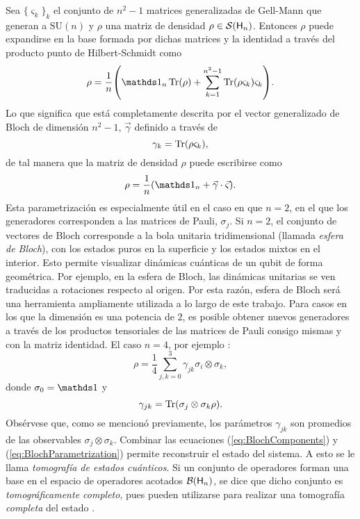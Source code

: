Sea $\{\varsigma_{k}\}_{k}$ el conjunto de $n^{2}-1$ matrices generalizadas de Gell-Mann que generan a $\text{SU}(n)$ y $\rho$ una matriz de densidad $\rho\in\mathcal{S}({\sf H}_{n})$. Entonces $\rho$ puede expandirse en la base formada por dichas matrices y la identidad a través del producto punto de Hilbert-Schmidt como
\begin{equation}
    \rho=\frac{1}{n}\qty(\Id_{n}\Tr(\rho)+\sum_{k=1}^{n^{2}-1}\Tr(\rho\varsigma_{k})\varsigma_{k}).\nonumber
\end{equation}
Lo que significa que está completamente descrita por el vector generalizado de Bloch de dimensión $n^{2}-1$, $\vec{\gamma}$ definido a través de
\begin{equation}
    \gamma_{k}=\Tr(\rho\varsigma_{k}),\nonumber
\end{equation}
de tal manera que la matriz de densidad $\rho$ puede escribirse como
\begin{equation}\label{eq:BlochParametrization}
    \rho=\frac{1}{n}\qty(\Id_{n}+\vec{\gamma}\cdot\vec{\varsigma}).
\end{equation}
Esta parametrización es especialmente útil en el caso en que $n=2$, en el que los generadores corresponden a las matrices de Pauli, $\sigma_{j}$. Si $n=2$, el conjunto de vectores de Bloch corresponde a la bola unitaria tridimensional (llamada \textit{esfera de Bloch}), con los estados puros en la superficie y los estados mixtos en el interior. Esto permite visualizar dinámicas cuánticas de un qubit de forma geométrica. Por ejemplo, en la esfera de Bloch, las dinámicas unitarias se ven traducidas a rotaciones respecto al origen. Por esta razón, esfera de Bloch será una herramienta ampliamente utilizada a lo largo de este trabajo. Para casos en los que la dimensión es una potencia de $2$, es posible obtener nuevos generadores a través de los productos tensoriales de las matrices de Pauli consigo mismas y con la matriz identidad. El caso $n=4$, por ejemplo \cite{Chuang}:
\begin{equation}\label{eq:BlochParametrization4}
    \rho=\frac{1}{4}\sum_{j,k=0}^{3}\gamma_{jk}\sigma_{i}\otimes \sigma_{k},\nonumber
\end{equation}
donde $\sigma_{0}=\Id$ y 
\begin{equation}\label{eq:BlochComponents}
        \gamma_{jk}=\Tr(\sigma_{j}\otimes \sigma_{k}\rho).
\end{equation}
Obsérvese que, como se mencionó previamente, los parámetros $\gamma_{jk}$ son promedios de las observables $\sigma_{j} \otimes \sigma_{k}$. Combinar las ecuaciones (\ref{eq:BlochComponents}) y (\ref{eq:BlochParametrization}) permite reconstruir el estado del sistema. A esto se le llama \textit{tomografía de estados cuánticos}. Si un conjunto de operadores forman una base en el espacio de operadores acotados $\mathcal{B}({\sf H}_{n})$, se dice que dicho conjunto es \textit{tomográficamente completo}, pues pueden utilizarse para realizar una tomografía \textit{completa} del estado \cite{Chuang}.
